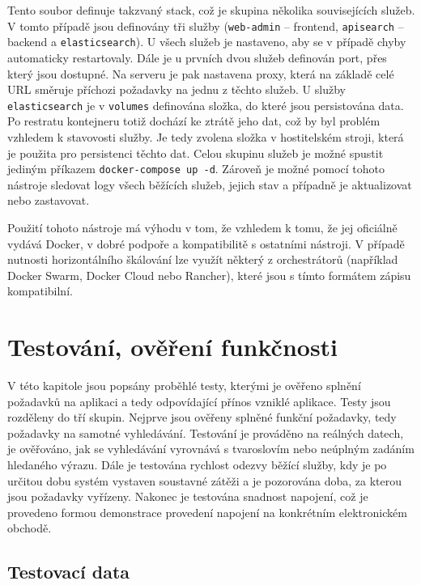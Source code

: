 \documentclass[FM,DP]{tulthesis}
\begin{document}
Tento soubor definuje takzvaný stack, což je skupina několika souvisejících služeb. V tomto
případě jsou definovány tři služby (\verb|web-admin| -- frontend, \verb|apisearch| -- backend 
a \verb|elasticsearch|). U všech služeb je nastaveno, aby se v případě chyby automaticky restartovaly.
Dále je u prvních dvou služeb definován port, přes který jsou dostupné. Na serveru je pak 
nastavena proxy, která na základě celé URL směruje příchozi požadavky na jednu z těchto služeb.
U služby \verb|elasticsearch| je v \verb|volumes| definována složka, do které jsou persistována
data. Po restratu kontejneru totiž dochází ke ztrátě jeho dat, což by byl problém vzhledem
k stavovosti služby. Je tedy zvolena složka v hostitelském stroji, která je použita pro persistenci
těchto dat. Celou skupinu služeb je možné spustit jediným příkazem \verb|docker-compose up -d|.
Zároveň je možné pomocí tohoto nástroje sledovat logy všech běžících služeb, jejich stav
a případně je aktualizovat nebo zastavovat.

Použití tohoto nástroje má výhodu v tom, že vzhledem k tomu, že jej oficiálně vydává Docker, 
v dobré podpoře a kompatibilitě s ostatními nástroji. V případě nutnosti horizontálního škálování
lze využít některý z orchestrátorů \cite[strana~300]{devops} (například Docker Swarm, Docker Cloud 
nebo Rancher), které jsou s tímto formátem zápisu kompatibilní. 


\chapter{Testování, ověření funkčnosti}

V této kapitole jsou popsány proběhlé testy, kterými je ověřeno splnění požadavků na aplikaci
a tedy odpovídající přínos vzniklé aplikace. Testy jsou rozděleny do tří skupin. Nejprve jsou
ověřeny splněné funkční požadavky, tedy požadavky na samotné vyhledávání. Testování je
prováděno na reálných datech, je ověřováno, jak se vyhledávání vyrovnává s tvaroslovím 
nebo neúplným zadáním hledaného výrazu. Dále je testována rychlost odezvy běžící služby, 
kdy je po určitou dobu systém vystaven soustavné zátěži a je pozorována doba, za kterou jsou 
požadavky vyřízeny. Nakonec je testována snadnost napojení, což je provedeno formou demonstrace
provedení napojení na konkrétním elektronickém obchodě.

\section{Testovací data}
\end{document}

